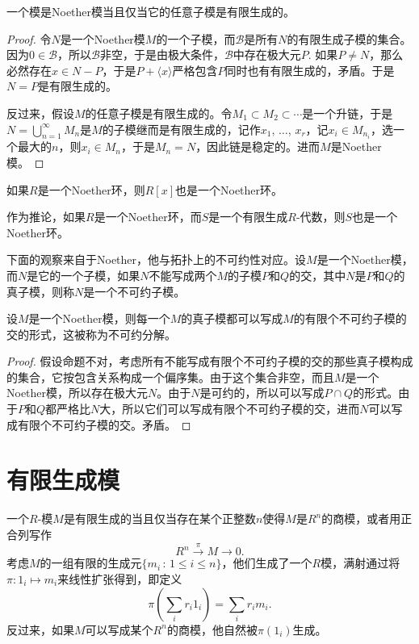 \begin{pro}
一个模是Noether模当且仅当它的任意子模是有限生成的。
\end{pro}

\begin{proof}
	令$N$是一个Noether模$M$的一个子模，而$\mathscr{B}$是所有$N$的有限生成子模的集合。因为$0\in \mathscr{B}$，所以$\mathscr{B}$非空，于是由极大条件，$\mathscr{B}$中存在极大元$P$. 如果$P\neq N$，那么必然存在$x\in N-P$，于是$P+\langle x\rangle$严格包含$P$同时也有有限生成的，矛盾。于是$N=P$是有限生成的。

	反过来，假设$M$的任意子模是有限生成的。令$M_1\subset M_2\subset \cdots$是一个升链，于是$N=\bigcup_{n=1}^\infty M_n$是$M$的子模继而是有限生成的，记作$x_1$, $\dots$, $x_r$，记$x_i\in M_{n_i}$，选一个最大的$n$，则$x_i\in M_n$，于是$M_n=N$，因此链是稳定的。进而$M$是Noether模。
\end{proof}

\begin{thm}[Hilbert基定理]
如果$R$是一个Noether环，则$R[x]$也是一个Noether环。\notprove
\end{thm}

作为推论，如果$R$是一个Noether环，而$S$是一个有限生成$R$-代数，则$S$也是一个Noether环。

\para 下面的观察来自于Noether，他与拓扑上的不可约性对应。设$M$是一个Noether模，而$N$是它的一个子模，如果$N$不能写成两个$M$的子模$P$和$Q$的交，其中$N$是$P$和$Q$的真子模，则称$N$是一个不可约子模。

\begin{pro}\label{irrde}
设$M$是一个Noether模，则每一个$M$的真子模都可以写成$M$的有限个不可约子模的交的形式，这被称为不可约分解。
\end{pro}

\begin{proof}
	假设命题不对，考虑所有不能写成有限个不可约子模的交的那些真子模构成的集合，它按包含关系构成一个偏序集。由于这个集合非空，而且$M$是一个Noether模，所以存在极大元$N$。由于$N$是可约的，所以可以写成$P\cap Q$的形式。由于$P$和$Q$都严格比$N$大，所以它们可以写成有限个不可约子模的交，进而$N$可以写成有限个不可约子模的交。矛盾。
\end{proof}

\section{有限生成模}

\para 一个$R$-模$M$是有限生成的当且仅当存在某个正整数$n$使得$M$是$R^n$的商模，或者用正合列写作
\[
	R^n \xrightarrow{\pi} M\to 0.
\]
考虑$M$的一组有限的生成元$\{m_i\,:\, 1\leq i\leq n\}$，他们生成了一个$R$模，满射通过将$\pi:1_i\mapsto m_i$来线性扩张得到，即定义
\[
	\pi\left(\sum_i r_i 1_i\right)=\sum_i r_i m_i.
\]
反过来，如果$M$可以写成某个$R^n$的商模，他自然被$\pi(1_i)$生成。

